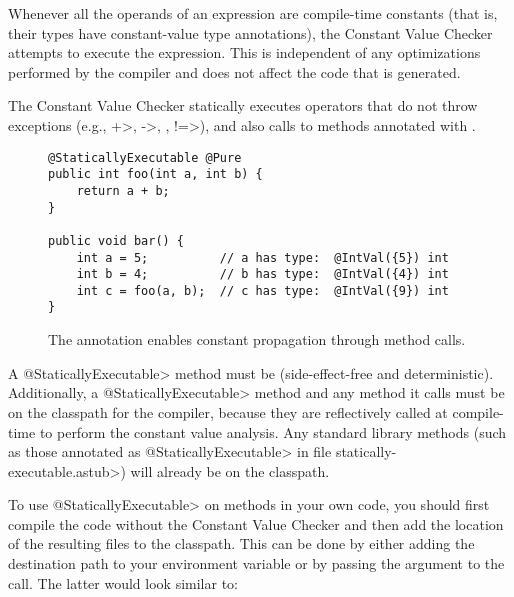 Whenever all the operands of an expression are compile-time constants (that
is, their types have constant-value type annotations), the Constant Value
Checker attempts to execute the expression.  This is independent of any
optimizations performed by the compiler and does not affect the code that
is generated.

The Constant Value Checker statically executes operators that do
not throw exceptions (e.g., \<+>, \<->, \code{<\relax<}, \<!=>), and also
calls to methods annotated with
.

\begin{figure}
\begin{Verbatim}
@StaticallyExecutable @Pure
public int foo(int a, int b) {
    return a + b;
}

public void bar() {
    int a = 5;          // a has type:  @IntVal({5}) int
    int b = 4;          // b has type:  @IntVal({4}) int
    int c = foo(a, b);  // c has type:  @IntVal({9}) int
}
\end{Verbatim}
\caption{The
   annotation enables
  constant propagation through method calls.}
\label{fig-staticallyexecutable}
\end{figure}

\begin{sloppypar}
A \<@StaticallyExecutable> method must
be  (side-effect-free and
deterministic).
Additionally, a \<@StaticallyExecutable> method and any method it calls must be on
the classpath for the compiler, because they are reflectively called at
compile-time to perform the constant value analysis. Any standard
library methods (such as those annotated as \<@StaticallyExecutable> in file
\<statically-executable.astub>) will already be on the
classpath.
\end{sloppypar}

\begin{sloppypar}
To use \<@StaticallyExecutable> on methods in your own code, you should
first compile the code without the Constant Value Checker and then add
the location of the resulting  files to the
classpath. This can be done by either adding the destination path to
your environment variable  or by passing the
argument  to the call. The latter
would look similar to:
\end{sloppypar}


